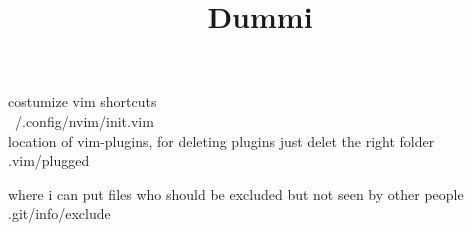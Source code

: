 \documentclass[12pt]{article}
\title{Dummi}
\begin{document}
\setlength{\parindent}{0pt}
\setlength{\parskip}{30pt}
\setlength{\baselineskip}{20pt}



costumize vim shortcuts \\
~/.config/nvim/init.vim
\\

location of vim-plugins, for deleting plugins just delet the right folder \\
.vim/plugged

where i can put files who should be excluded but not seen by other people
.git/info/exclude
\end{document}
